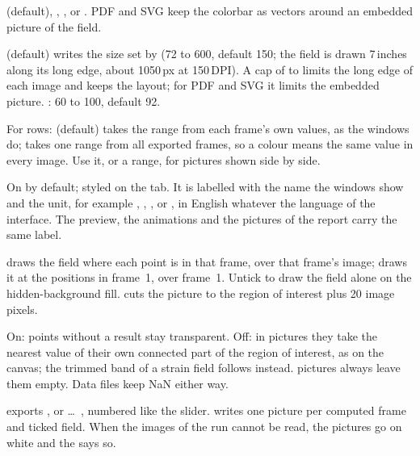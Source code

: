 \begin{description}[leftmargin=0.6cm,style=nextline]
  \item[Format]
     (default), , ,  or . PDF and SVG keep the colorbar as
    vectors around an embedded picture of the field.
  \item[Resolution (long edge), JPEG quality, DPI]
     (default) writes the size set by  (72 to 600, default 150; the
    field is drawn 7\,inches along its long edge, about 1050\,px at 150\,DPI). A cap of \ui{512 px}
    to \ui{2048 px} limits the long edge of each image and keeps the layout; for PDF and SVG it
    limits the embedded picture. : 60 to 100, default 92.
  \item[Auto range]
    For  rows:  (default) takes the range from each frame's own values, as
    the windows do;  takes one range from all exported frames, so a colour means
    the same value in every image. Use it, or a  range, for pictures shown side by side.
  \item[Include colorbar]
    On by default; styled on the  tab. It is labelled with the name the
    windows show and the unit, for example , , ,
     or , in English whatever the language of the
    interface. The preview, the animations and the pictures of the report carry the same label.
  \item[Render as]
     draws the field where each point is in that frame, over that frame's image;
     draws it at the positions in frame~1, over frame~1. Untick
     to draw the field alone on the hidden-background fill.  cuts the picture to the region of interest plus 20 image pixels.
  \item[Hide untracked regions]
    On: points without a result stay transparent. Off: in  pictures they take
    the nearest value of their own connected part of the region of interest, as on the canvas;
    the trimmed band of a strain field follows  instead.
     pictures always leave them empty. Data files keep NaN either way.
\end{description}

 exports , or  \ldots\ , numbered like the slider.
 writes one picture per computed frame and ticked field. When the images of the
run cannot be read, the pictures go on white and the  says so.

